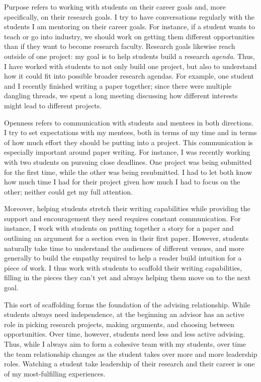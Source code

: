 \documentclass{article}
\theoremstyle{definition}
\begin{document}
Purpose refers to working with students on their career goals and, more specifically, on their research goals.
I try to have conversations regularly with the students I am mentoring on their career goals.
For instance, if a student wants to teach or go into industry, we should work on getting them different opportunities than if they want to become research faculty.
Research goals likewise reach outside of one project: my goal is to help students build a research \emph{agenda}.
Thus, I have worked with students to not only build one project, but also to understand how it could fit into possible broader research agendas.
For example, one student and I recently finished writing a paper together; since there were multiple dangling threads, we spent a long meeting discussing how different interests might lead to different projects.

Openness refers to communication with students and mentees in both directions.
I try to set expectations with my mentees, both in terms of my time and in terms of how much effort they should be putting into a project.
This communication is especially important around paper writing.
For instance, I was recently working with two students on pursuing close deadlines.
One project was being submitted for the first time, while the other was being resubmitted.
I had to let both know how much time I had for their project given how much I had to focus on the other; neither could get my full attention.

Moreover, helping students stretch their writing capabilities while providing the support and encouragement they need requires constant communication.
For instance, I work with students on putting together a story for a paper and outlining an argument for a section even in their first paper.
However, students naturally take time to understand the audiences of different venues, and more generally to build the empathy required to help a reader build intuition for a piece of work.
I thus work with students to scaffold their writing capabilities, filling in the pieces they can't yet and always helping them move on to the next goal.

This sort of scaffolding forms the foundation of the advising relationship.
While students always need independence, at the beginning an advisor has an active role in picking research projects, making arguments, and choosing between opportunities.
Over time, however, students need less and less active advising.
Thus, while I always aim to form a cohesive team with my students, over time the team relationship changes as the student takes over more and more leadership roles.
Watching a student take leadership of their research and their career is one of my most-fulfilling experiences.
\end{document}
